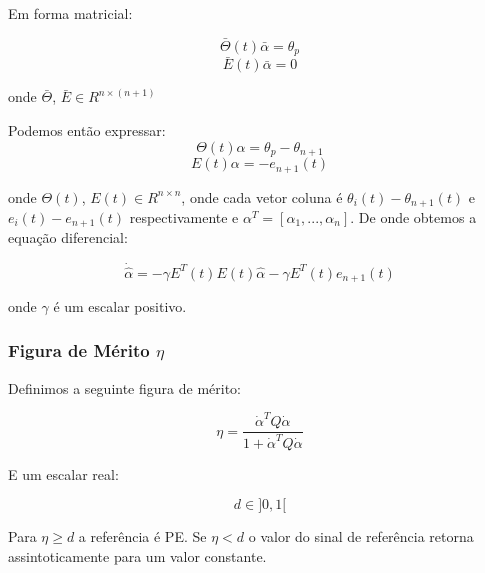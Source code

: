 \documentclass[aspectratio=169]{beamer}
\begin{document}
\begin{frame}
Em forma matricial:

\begin{equation*}
\bar{\Theta}(t)\bar{\alpha} = \theta_p
\end{equation*}
\begin{equation*}
\bar{E}(t)\bar{\alpha} = 0
\end{equation*}

onde $\bar{\Theta}$, $\bar{E} \in R^{n\times(n+1)}$

\end{frame}

\begin{frame}
Podemos então expressar:
\begin{equation*}
\Theta(t)\alpha = \theta_p - \theta_{n+1}
\end{equation*}
\begin{equation*}
E(t)\alpha = -e_{n+1}(t)
\end{equation*}

onde $\Theta(t)$, $E(t)\in R^{n\times n}$, onde cada vetor coluna é $\theta_i(t)-\theta_{n+1}(t)$ e $e_i(t)-e_{n+1}(t)$ respectivamente e $\alpha^T = [\alpha_1,...,\alpha_n]$. De onde obtemos a equação diferencial:

\begin{equation*}
\dot{\hat{\alpha}} = -\gamma E^T(t)E(t)\hat{\alpha} - \gamma E^T(t)e_{n+1}(t)
\end{equation*}

onde $\gamma$ é um escalar positivo.

\end{frame}


\begin{frame}
\frametitle{Figura de Mérito $\eta$}

Definimos a seguinte figura de mérito:

\begin{equation*}
\eta = \frac{\dot{\alpha}^T Q\dot{\alpha}}{1+\dot{\alpha}^T Q\dot{\alpha}}
\end{equation*}

E um escalar real:

\begin{equation}
d \in  ]0,1[
\end{equation}

Para $\eta\geq d$ a referência é PE. Se $\eta<d$ o valor do sinal de referência retorna assintoticamente para um valor constante.\\


\end{frame}
\end{document}
